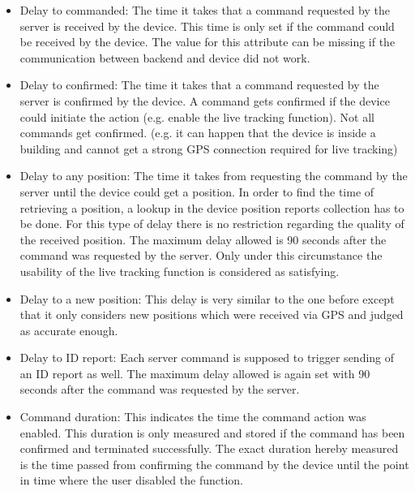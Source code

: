 \begin{itemize}
	\begin{itemize}
		\item Delay to commanded: The time it takes that a command requested by the server is received by the device. This time is only set if the command could be received by the device. The value for this attribute can be missing if the communication between backend and device did not work.
		\item Delay to confirmed: The time it takes that a command requested by the server is confirmed by the device. A command gets confirmed if the device could initiate the action (e.g. enable the live tracking function). Not all commands get confirmed. (e.g. it can happen that the device is inside a building and cannot get a strong GPS connection required for live tracking)
		\item Delay to any position: The time it takes from requesting the command by the server until the device could get a position. In order to find the time of retrieving a position, a lookup in the device position reports collection has to be done. For this type of delay there is no restriction regarding the quality of the received position. The maximum delay allowed is 90 seconds after the command was requested by the server. Only under this circumstance the usability of the live tracking function is considered as satisfying. 
		\item Delay to a new position: This delay is very similar to the one before except that it only considers new positions which were received via GPS and judged as accurate enough. 
		\item Delay to ID report: Each server command is supposed to trigger sending of an ID report as well. The maximum delay allowed is again set with 90 seconds after the command was requested by the server. 
		\item Command duration: This indicates the time the command action was enabled. This duration is only measured and stored if the command has been confirmed and terminated successfully. The exact duration hereby measured is the time passed from confirming the command by the device until the point in time where the user disabled the function. 
	\end{itemize}


\end{itemize}
